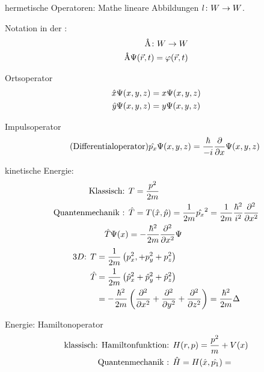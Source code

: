 \begin{bem}
    \item hermetische Operatoren: Mathe lineare Abbildungen $l \colon W \rightarrow W$.

    Notation in der \QM:
    \begin{align*}
        \mbox{\normalfont\AA} \colon W \rightarrow W \\
        \mbox{\normalfont\AA} \Psi(\vec{r},t) = \varphi(\vec{r},t)
    \end{align*}
    \begin{bei}
        \item{Ortsoperator}
        \begin{align*}
            \hat{x}\Psi(x,y,z) &= x \Psi(x,y,z)\\
            \hat{y}\Psi(x,y,z) &= y \Psi(x,y,z)
        \end{align*}
        \item{Impulsoperator}
        \begin{equation*}
            \tag{Differentialoperator}
            \hat{p_x} \Psi (x,y,z) = \frac{\hbar}{-i}\frac{\partial}{\partial x}\Psi (x,y,z)
        \end{equation*}
        \item{kinetische Energie:} 
            \begin{align*}
                \text{Klassisch: } & T= \frac{p^2}{2m} \\
                \text{Quantenmechanik : } & \hat{T} = T(\hat{x},\hat{p}) 
                = \frac{1}{2m}\hat{p_x}^2 
                = \frac{1}{2m}\frac{\hbar^2}{i^2}\frac{\partial^2}{\partial x^2} \\
                \hat{T}\Psi(x)&= -\frac{\hbar^2}{2m}\frac{\partial^2}{\partial x^2}\Psi
            \end{align*}
            \begin{align*}
                \text{$3D$: } T &= \frac{1}{2m}\left( p_x^2, + p_y^2 + p_z^2 \right) \\
                \hat{T} &= \frac{1}{2m}\left( \hat{p}_x^2 + \hat{p}_y^2 + \hat{p}_z^2\right)\\
                &= -\frac{\hbar^2}{2m}\left( \frac{\partial^2}{\partial x^2}+\frac{\partial^2}{\partial 
                y^2}+\frac{\partial^2}{\partial z^2} \right) = \frac{\hbar^2}{2m}\Delta
            \end{align*}
        \item{Energie: Hamiltonoperator}
            \begin{align*}
                \text{klassisch: Hamiltonfunktion: } &
                H(r,p)=\frac{p^2}{m}+V(x)\\
                \text{\QM: } &\h{H} = H (\h{x},\h{p_1})=

\end{align*}
\end{bei}
\end{bem}
